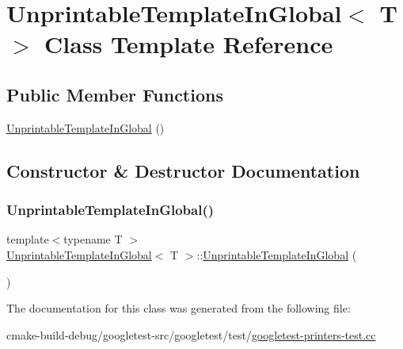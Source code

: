\hypertarget{classUnprintableTemplateInGlobal}{}\section{Unprintable\+Template\+In\+Global$<$ T $>$ Class Template Reference}
\label{classUnprintableTemplateInGlobal}
\subsection*{Public Member Functions}
\begin{DoxyCompactItemize}
\item 
\mbox{\hyperlink{classUnprintableTemplateInGlobal_a50fb82625ee9f5cceadf42f8b0f15bf7}{Unprintable\+Template\+In\+Global}} ()
\end{DoxyCompactItemize}


\subsection{Constructor \& Destructor Documentation}
\mbox{\label{classUnprintableTemplateInGlobal_a50fb82625ee9f5cceadf42f8b0f15bf7}} 
\subsubsection{\texorpdfstring{UnprintableTemplateInGlobal()}{UnprintableTemplateInGlobal()}}
{\footnotesize\ttfamily template$<$typename T $>$ \\
\mbox{\hyperlink{classUnprintableTemplateInGlobal}{Unprintable\+Template\+In\+Global}}$<$ T $>$\+::\mbox{\hyperlink{classUnprintableTemplateInGlobal}{Unprintable\+Template\+In\+Global}} (\begin{DoxyParamCaption}{ }\end{DoxyParamCaption})\hspace{0.3cm}{\ttfamily [inline]}}



The documentation for this class was generated from the following file\+:\begin{DoxyCompactItemize}
\item 
cmake-\/build-\/debug/googletest-\/src/googletest/test/\mbox{\hyperlink{googletest-printers-test_8cc}{googletest-\/printers-\/test.\+cc}}\end{DoxyCompactItemize}

